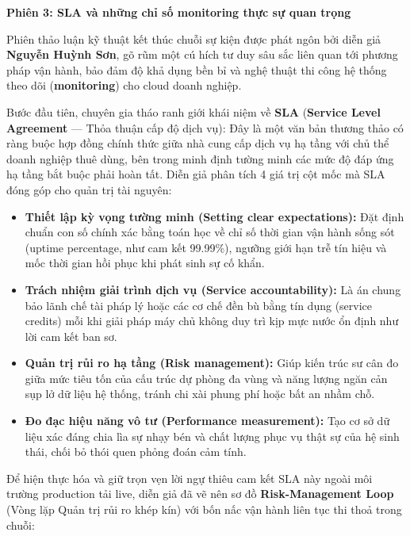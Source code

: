 \vspace{0.5em}\noindent\textbf{Phiên 3: SLA và những chỉ số monitoring thực sự quan
trọng}\par

Phiên thảo luận kỹ thuật kết thúc chuỗi sự kiện được phát ngôn bởi diễn
giả \textbf{Nguyễn Huỳnh Sơn}, gõ rũm một cú hích tư duy sâu sắc liên
quan tới phương pháp vận hành, bảo đảm độ khả dụng bền bỉ và nghệ thuật
thi công hệ thống theo dõi (\textbf{monitoring}) cho cloud doanh nghiệp.

Bước đầu tiên, chuyên gia tháo ranh giới khái niệm về \textbf{SLA}
(\textbf{Service Level Agreement} --- Thỏa thuận cấp độ dịch vụ): Đây là
một văn bản thương thảo có ràng buộc hợp đồng chính thức giữa nhà cung
cấp dịch vụ hạ tầng với chủ thể doanh nghiệp thuê dùng, bên trong minh
định tường minh các mức độ đáp ứng hạ tầng bắt buộc phải hoàn tất. Diễn
giả phân tích 4 giá trị cột mốc mà SLA đóng góp cho quản trị tài nguyên:

\begin{itemize}
\tightlist
\item
  \textbf{Thiết lập kỳ vọng tường minh (Setting clear expectations):}
  Đặt định chuẩn con số chính xác bằng toán học về chỉ số thời gian vận
  hành sống sót (uptime percentage, như cam kết 99.99\%), ngưỡng giới
  hạn trễ tín hiệu và mốc thời gian hồi phục khi phát sinh sự cố khẩn.
\item
  \textbf{Trách nhiệm giải trình dịch vụ (Service accountability):} Là
  án chung bảo lãnh chế tài pháp lý hoặc các cơ chế đền bù bằng tín dụng
  (service credits) mỗi khi giải pháp máy chủ không duy trì kịp mực nước
  ổn định như lời cam kết ban sơ.
\item
  \textbf{Quản trị rủi ro hạ tầng (Risk management):} Giúp kiến trúc sư
  cân đo giữa mức tiêu tốn của cấu trúc dự phòng đa vùng và năng lượng
  ngăn cản sụp lở dữ liệu hệ thống, tránh chi xài phung phí hoặc bất an
  nhầm chỗ.
\item
  \textbf{Đo đạc hiệu năng vô tư (Performance measurement):} Tạo cơ sở
  dữ liệu xác đáng chia lìa sự nhạy bén và chất lượng phục vụ thật sự
  của hệ sinh thái, chối bỏ thói quen phỏng đoán cảm tính.
\end{itemize}

Để hiện thực hóa và giữ trọn vẹn lời ngự thiêu cam kết SLA này ngoài môi
trường production tải live, diễn giả đã vẽ nên sơ đồ
\textbf{Risk-Management Loop} (Vòng lặp Quản trị rủi ro khép kín) với
bốn nấc vận hành liên tục thi thoả trong chuỗi:

